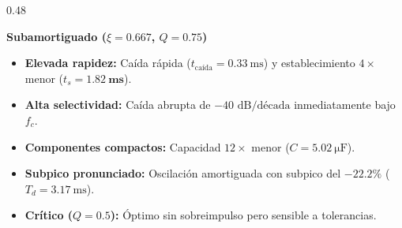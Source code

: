 \documentclass[aspectratio=169, 10pt]{beamer}
\begin{document}
\begin{frame}
\begin{columns}[t, onlytextwidth]
    \begin{column}{0.48\textwidth}
      \begin{tarjeta}
        {\fontsize{8.5pt}{10.5pt}\selectfont \textbf{\color{NavyDark} Subamortiguado ($\xi = 0.667$, $Q = 0.75$)}}\\[2pt]
        {\fontsize{7.5pt}{9.5pt}\selectfont
        \begin{itemize}\setlength{\itemsep}{2pt}
          \item \textbf{Elevada rapidez:} Caída rápida ($t_{\text{caída}} = \qty{0.33}{\milli\second}$) y establecimiento $4\times$ menor ($t_s = \mathbf{\qty{1.82}{\milli\second}}$).
          \item \textbf{Alta selectividad:} Caída abrupta de $-40\text{ dB/década}$ inmediatamente bajo $f_c$.
          \item \textbf{Componentes compactos:} Capacidad $12\times$ menor ($C = \qty{5.02}{\micro\farad}$).
          \item \textbf{Subpico pronunciado:} Oscilación amortiguada con subpico del $\mathbf{-22.2\%}$ ($T_d = \qty{3.17}{\milli\second}$).
          \item \textbf{Crítico ($Q = 0.5$):} Óptimo sin sobreimpulso pero sensible a tolerancias.
        \end{itemize}
        }
      \end{tarjeta}
    \end{column}
  \end{columns}
\end{frame}

\end{document}
